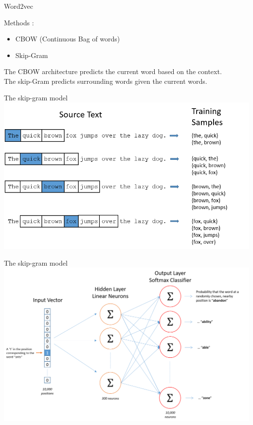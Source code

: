 \documentclass{beamer}
\begin{document}
\begin{frame}{Word2vec}

Methods :
\begin{itemize}
\item 
CBOW (Continuous Bag of words)
\item
Skip-Gram
\end{itemize}

The CBOW architecture predicts the current word based on the context. \\
The skip-Gram predicts surrounding words given the current words.


\end{frame}




\begin{frame}{The skip-gram model}
\includegraphics[width=\textwidth]{training_data.png}
\end{frame}


\begin{frame}{The skip-gram model}
\includegraphics[width=\textwidth]{skip_gram_net_arch.png}
\end{frame}
\end{document}
